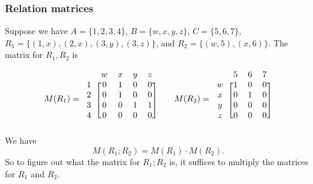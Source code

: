 \documentclass[11pt]{article}
\begin{document}
    \subsubsection{Relation matrices}

    Suppose we have \(A = \{1,2,3,4\}\), \(B = \{w,x,y,z\}\), \(C = \{5,6,7\}\), \(R_1 = \{(1,x),(2,x),(3,y),(3,z)\}\), and \(R_2 = \{ (w,5), (x,6) \}\). The matrix for \(R_1, R_2\) is

    \begin{equation*}
        M(R_1) = \begin{blockarray}{ccccc}
                    & w & x & y & z \\
                    \begin{block}{c[ cccc ]}
                        1 & 0 & 1 & 0 & 0 \\
                        2 & 0 & 1 & 0 & 0 \\
                        3 & 0 & 0 & 1 & 1 \\
                        4 & 0 & 0 & 0 & 0 \\
                    \end{block}
                \end{blockarray} \qquad M(R_2) = \begin{blockarray}{cccc}
                    & 5 & 6 & 7 \\
                    \begin{block}{c [ccc]}
                        w & 1 & 0 & 0 \\
                        x & 0 & 1 & 0 \\
                        y & 0 & 0 & 0 \\
                        z & 0 & 0 & 0 \\
                    \end{block}
                \end{blockarray}
    \end{equation*}
    We have \[M(R_1;R_2) = M(R_1) \cdot M(R_2).\] So to figure out what the matrix for \(R_1;R_2\) is, it suffices to multiply the matrices for \(R_1\) and \(R_2\).
\end{document}
